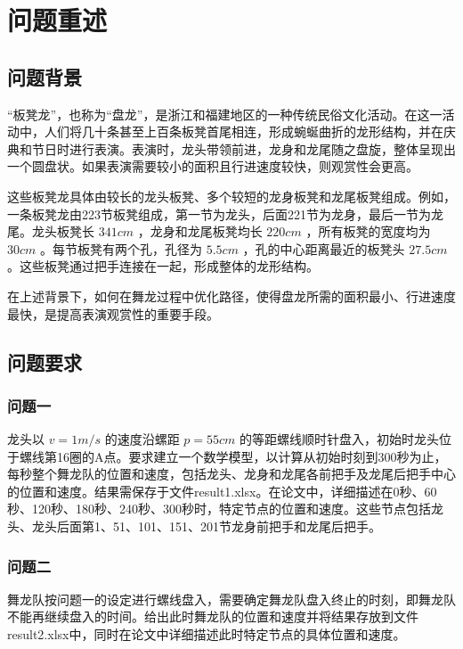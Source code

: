 \documentclass[withoutpreface, bwprint]{cumcmthesis} %
\begin{document}
\section{问题重述}

\subsection{问题背景}

“板凳龙”，也称为“盘龙”，是浙江和福建地区的一种传统民俗文化活动。在这一活动中，人们将几十条甚至上百条板凳首尾相连，形成蜿蜒曲折的龙形结构，并在庆典和节日时进行表演。表演时，龙头带领前进，龙身和龙尾随之盘旋，整体呈现出一个圆盘状。如果表演需要较小的面积且行进速度较快，则观赏性会更高。

这些板凳龙具体由较长的龙头板凳、多个较短的龙身板凳和龙尾板凳组成。例如，一条板凳龙由223节板凳组成，第一节为龙头，后面221节为龙身，最后一节为龙尾。龙头板凳长 $ 341cm $ ，龙身和龙尾板凳均长 $ 220cm $ ，所有板凳的宽度均为 $ 30cm $ 。每节板凳有两个孔，孔径为 $ 5.5cm $ ，孔的中心距离最近的板凳头 $ 27.5cm $ 。这些板凳通过把手连接在一起，形成整体的龙形结构。

在上述背景下，如何在舞龙过程中优化路径，使得盘龙所需的面积最小、行进速度最快，是提高表演观赏性的重要手段。

\subsection{问题要求}

\subsubsection*{问题一}

龙头以 $ v=1 m/s $ 的速度沿螺距 $ p=55 cm $ 的等距螺线顺时针盘入，初始时龙头位于螺线第16圈的A点。要求建立一个数学模型，以计算从初始时刻到300秒为止，每秒整个舞龙队的位置和速度，包括龙头、龙身和龙尾各前把手及龙尾后把手中心的位置和速度。结果需保存于文件result1.xlsx。在论文中，详细描述在0秒、60秒、120秒、180秒、240秒、300秒时，特定节点的位置和速度。这些节点包括龙头、龙头后面第1、51、101、151、201节龙身前把手和龙尾后把手。

\subsubsection*{问题二}

舞龙队按问题一的设定进行螺线盘入，需要确定舞龙队盘入终止的时刻，即舞龙队不能再继续盘入的时间。给出此时舞龙队的位置和速度并将结果存放到文件result2.xlsx中，同时在论文中详细描述此时特定节点的具体位置和速度。
\end{document}
